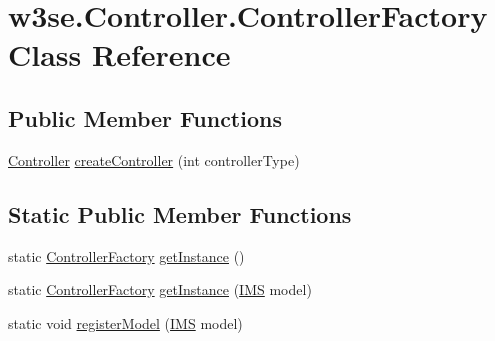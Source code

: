 \hypertarget{classw3se_1_1_controller_1_1_controller_factory}{\section{w3se.\-Controller.\-Controller\-Factory Class Reference}
\label{classw3se_1_1_controller_1_1_controller_factory}
}
\subsection*{Public Member Functions}
\begin{DoxyCompactItemize}
\item 
\hyperlink{interfacew3se_1_1_controller_1_1_controller}{Controller} \hyperlink{classw3se_1_1_controller_1_1_controller_factory_aa98700d9b1e8c389d544eced557c2f41}{create\-Controller} (int controller\-Type)
\end{DoxyCompactItemize}
\subsection*{Static Public Member Functions}
\begin{DoxyCompactItemize}
\item 
static \hyperlink{classw3se_1_1_controller_1_1_controller_factory}{Controller\-Factory} \hyperlink{classw3se_1_1_controller_1_1_controller_factory_a9328085c9578be93a2ab3fd7e63e48dd}{get\-Instance} ()
\item 
static \hyperlink{classw3se_1_1_controller_1_1_controller_factory}{Controller\-Factory} \hyperlink{classw3se_1_1_controller_1_1_controller_factory_a608ffad3b8455bee8011f748a1350a22}{get\-Instance} (\hyperlink{classw3se_1_1_model_1_1_i_m_s}{I\-M\-S} model)
\item 
static void \hyperlink{classw3se_1_1_controller_1_1_controller_factory_a8d17247f3d84673720934a89a9387dde}{register\-Model} (\hyperlink{classw3se_1_1_model_1_1_i_m_s}{I\-M\-S} model)
\end{DoxyCompactItemize}
